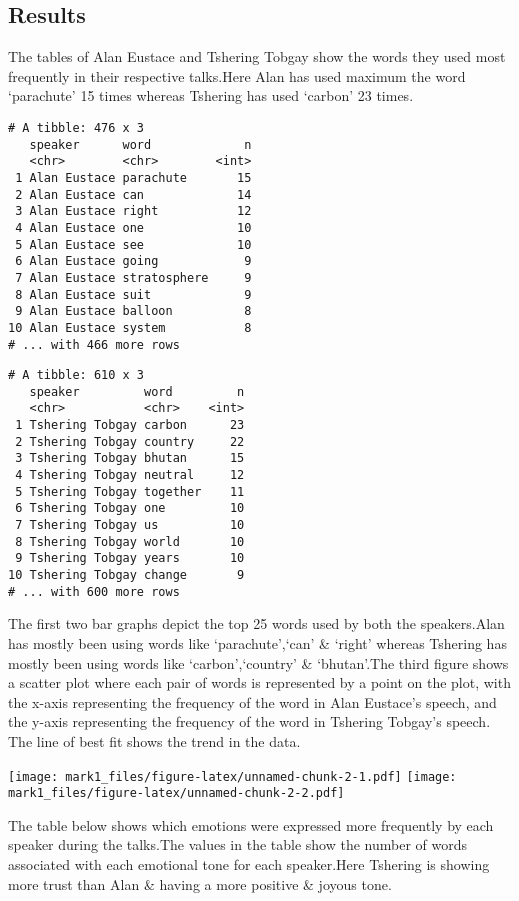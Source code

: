 \documentclass[
]{article}
\begin{document}
\hypertarget{results}{%
\subsection{Results}\label{results}}

The tables of Alan Eustace and Tshering Tobgay show the words they used
most frequently in their respective talks.Here Alan has used maximum the
word `parachute' 15 times whereas Tshering has used `carbon' 23 times.

\begin{verbatim}
# A tibble: 476 x 3
   speaker      word             n
   <chr>        <chr>        <int>
 1 Alan Eustace parachute       15
 2 Alan Eustace can             14
 3 Alan Eustace right           12
 4 Alan Eustace one             10
 5 Alan Eustace see             10
 6 Alan Eustace going            9
 7 Alan Eustace stratosphere     9
 8 Alan Eustace suit             9
 9 Alan Eustace balloon          8
10 Alan Eustace system           8
# ... with 466 more rows
\end{verbatim}

\begin{verbatim}
# A tibble: 610 x 3
   speaker         word         n
   <chr>           <chr>    <int>
 1 Tshering Tobgay carbon      23
 2 Tshering Tobgay country     22
 3 Tshering Tobgay bhutan      15
 4 Tshering Tobgay neutral     12
 5 Tshering Tobgay together    11
 6 Tshering Tobgay one         10
 7 Tshering Tobgay us          10
 8 Tshering Tobgay world       10
 9 Tshering Tobgay years       10
10 Tshering Tobgay change       9
# ... with 600 more rows
\end{verbatim}

The first two bar graphs depict the top 25 words used by both the
speakers.Alan has mostly been using words like `parachute',`can' \&
`right' whereas Tshering has mostly been using words like
`carbon',`country' \& `bhutan'.The third figure shows a scatter plot
where each pair of words is represented by a point on the plot, with the
x-axis representing the frequency of the word in Alan Eustace's speech,
and the y-axis representing the frequency of the word in Tshering
Tobgay's speech. The line of best fit shows the trend in the data.

\texttt{[image: mark1\_files/figure-latex/unnamed-chunk-2-1.pdf]}
\texttt{[image: mark1\_files/figure-latex/unnamed-chunk-2-2.pdf]}

The table below shows which emotions were expressed more frequently by
each speaker during the talks.The values in the table show the number of
words associated with each emotional tone for each speaker.Here Tshering
is showing more trust than Alan \& having a more positive \& joyous
tone.
\end{document}
